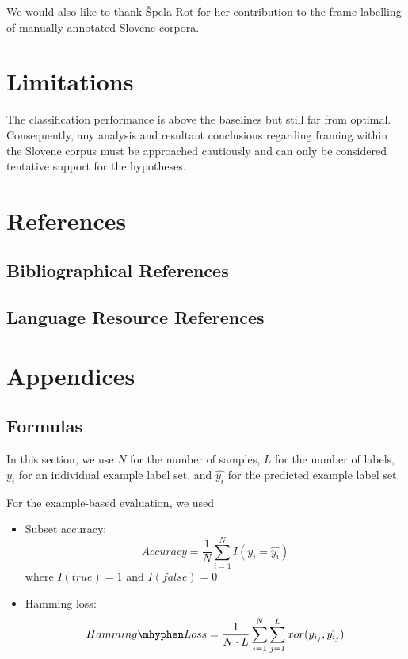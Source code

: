 \documentclass[10pt, a4paper]{article}
\begin{document}
We would also like to thank Špela Rot for her contribution to the frame labelling of manually annotated Slovene corpora.

\section{Limitations}
The classification performance is above the baselines but still far from optimal.
Consequently, any analysis and resultant conclusions regarding framing within the Slovene corpus must be approached cautiously and can only be considered tentative support for the hypotheses.


\nocite{*}
\section{References}
\label{sec:reference}
\subsection{Bibliographical References}
\label{subsec:bib_reference}




\subsection{Language Resource References}
\label{subsec:res_reference}


\section{Appendices}
\label{sec:appendices}
\appendix
{}
\renewcommand{\thesubsection}{\Alph{subsection}}

\subsection{Formulas}
\label{subsec:formulas}
In this section, we use $N$ for the number of samples, $L$ for the number of labels, $y_i$ for an individual example label set, and $\hat{y_i}$ for the predicted example label set.

For the example-based evaluation, we used
\begin{itemize}
  \item Subset accuracy:
    \begin{equation*}
      Accuracy = \frac{1}{N}\sum_{i=1}^{N}I( y_i = \hat{y_i})
    \end{equation*}
    where  $I(true) = 1$ and $I(false) = 0$
  \item Hamming loss:
    \begin{equation*}
      Hamming\mhyphen Loss = \frac{1}{N \cdot L}\sum_{i=1}^{N}\sum_{j=1}^{L}{xor(y_{i_j},\hat{y_{i_j}})}
    \end{equation*}
\end{itemize}
\end{document}
